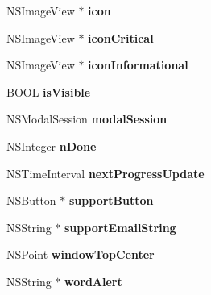 \begin{CompactItemize}
\item 
\hypertarget{interface_s_s_y_alert_ae733ffdb4155121f3dc2e593dbb7ede}{
NSImageView $\ast$ \textbf{icon}}
\label{interface_s_s_y_alert_ae733ffdb4155121f3dc2e593dbb7ede}

\item 
\hypertarget{interface_s_s_y_alert_8c376f5d30dc153d896408bc1fe77ebe}{
NSImageView $\ast$ \textbf{iconCritical}}
\label{interface_s_s_y_alert_8c376f5d30dc153d896408bc1fe77ebe}

\item 
\hypertarget{interface_s_s_y_alert_d10dde4bec21f3e6ae107f54fbc59b18}{
NSImageView $\ast$ \textbf{iconInformational}}
\label{interface_s_s_y_alert_d10dde4bec21f3e6ae107f54fbc59b18}

\item 
\hypertarget{interface_s_s_y_alert_43b4851bf4b4e100aa74022118bbdde2}{
BOOL \textbf{isVisible}}
\label{interface_s_s_y_alert_43b4851bf4b4e100aa74022118bbdde2}

\item 
\hypertarget{interface_s_s_y_alert_ae998df31358337c7b899b3fc50c6903}{
NSModalSession \textbf{modalSession}}
\label{interface_s_s_y_alert_ae998df31358337c7b899b3fc50c6903}

\item 
\hypertarget{interface_s_s_y_alert_7bf654708edf52c176db42b9914a4f67}{
NSInteger \textbf{nDone}}
\label{interface_s_s_y_alert_7bf654708edf52c176db42b9914a4f67}

\item 
\hypertarget{interface_s_s_y_alert_cc7f0ddfc66b1e976d433841a937b7bd}{
NSTimeInterval \textbf{nextProgressUpdate}}
\label{interface_s_s_y_alert_cc7f0ddfc66b1e976d433841a937b7bd}

\item 
\hypertarget{interface_s_s_y_alert_5aeb6db7343dcc8649cde5965d759f09}{
NSButton $\ast$ \textbf{supportButton}}
\label{interface_s_s_y_alert_5aeb6db7343dcc8649cde5965d759f09}

\item 
\hypertarget{interface_s_s_y_alert_1d600ac201e1d3e9a93cd6803cf63e64}{
NSString $\ast$ \textbf{supportEmailString}}
\label{interface_s_s_y_alert_1d600ac201e1d3e9a93cd6803cf63e64}

\item 
\hypertarget{interface_s_s_y_alert_ce2a59768708546f669470ec7255a63f}{
NSPoint \textbf{windowTopCenter}}
\label{interface_s_s_y_alert_ce2a59768708546f669470ec7255a63f}

\item 
\hypertarget{interface_s_s_y_alert_d1de5ffdf2fd0c63b08888f3f8742254}{
NSString $\ast$ \textbf{wordAlert}}
\label{interface_s_s_y_alert_d1de5ffdf2fd0c63b08888f3f8742254}

\end{CompactItemize}
